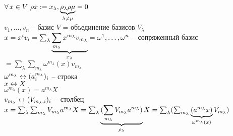 \documentclass[12pt]{article}
\begin{document}
\begin{enumerate}
    $\fall x \in V\ \rho x := x_\lambda, \ub{\lambda\neq \mu}{\rho_\lambda\rho\mu} = 0$\\
    $v_1,\ldots, v_n$ -- базис $V$ = объединение базисов $V_\lambda$\\
    $x = x^i v_i = \sum_\lambda \ub{x_\lambda}{\sum_{m_\lambda} x^{m_\lambda}v_{m_\lambda}} = \omega^1, \ldots, \omega^n$ -- сопряженный базис $= \sum_\lambda \sum_{m_\lambda}\omega^{m_\lambda}(x)v_{m_\lambda}$\\
    $\omega^{m_\lambda} \lrto (a^{m_\lambda}_i)_i$ -- строка\\
    $x \lrto X$\\
    $\omega^{m_\lambda} (x) = a^{m_\lambda}X$\\
    $v_{m_\lambda} \lrto (V_{m_\lambda, i})_i$ -- столбец\\
    $x = \sum_\lambda \sum_{m_\lambda}V_{m_\lambda}a^{m_\lambda}X = \sum_\lambda \ub{\rho_\lambda}{(\sum_{m_\lambda} V_{m_\lambda}a^{m_\lambda})}X = \sum_\lambda (\sum_{m_\lambda} \ub{\omega^{m_\lambda}(x)}{(a^{m_\lambda}x)} V_{m_\lambda})$\\
\end{enumerate}
\end{document}
